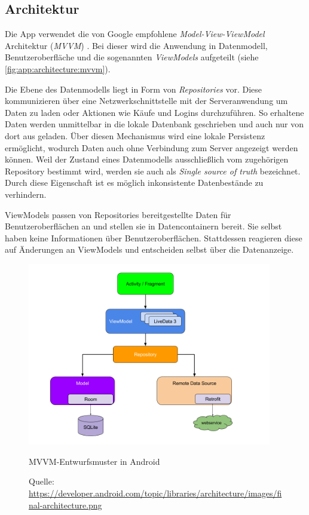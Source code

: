 \documentclass[a4paper, 11pt]{article}
\begin{document}
\subsection{Architektur}
\label{subsec:app:architecture}
Die App verwendet die von Google empfohlene \textit{Model-View-ViewModel} Architektur (\textit{MVVM}) \autocite{androidarchitecture}.
Bei dieser wird die Anwendung in Datenmodell, Benutzeroberfläche und die sogenannten \textit{ViewModels} aufgeteilt (siehe \autoref{fig:app:architecture:mvvm}).

Die Ebene des Datenmodells liegt in Form von \textit{Repositories} vor.
Diese kommunizieren über eine Netzwerkschnittstelle mit der Serveranwendung um Daten zu laden oder Aktionen wie Käufe und Logins durchzuführen.
So erhaltene Daten werden unmittelbar in die lokale Datenbank geschrieben und auch nur von dort aus geladen.
Über diesen Mechanismus wird eine lokale Persistenz ermöglicht, wodurch Daten auch ohne Verbindung zum Server angezeigt werden können.
Weil der Zustand eines Datenmodells ausschließlich vom zugehörigen Repository bestimmt wird, werden sie auch als \textit{Single source of truth} bezeichnet.
Durch diese Eigenschaft ist es möglich inkonsistente Datenbestände zu verhindern.

ViewModels passen von Repositories bereitgestellte Daten für Benutzeroberflächen an und stellen sie in Datencontainern bereit.
Sie selbst haben keine Informationen über Benutzeroberflächen.
Stattdessen reagieren diese auf Änderungen an ViewModels und entscheiden selbst über die Datenanzeige.

\begin{figure}[H]
	\centering
	\includegraphics[height=8cm,keepaspectratio]{./images/android-architecture.png}
	\caption{MVVM-Entwurfsmuster in Android}
	\caption*{\small Quelle: \url{https://developer.android.com/topic/libraries/architecture/images/final-architecture.png}}
	\label{fig:app:architecture:mvvm}
\end{figure}
\end{document}
